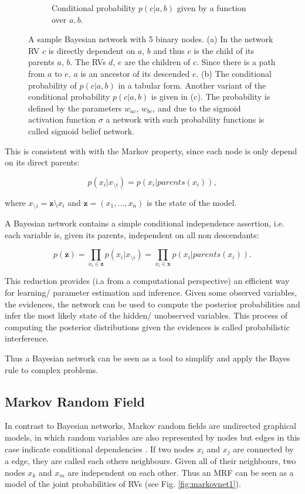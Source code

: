 \begin{figure}[h]
\begin{subfigure}[t]{.33\textwidth}
  		\caption{Conditional probability $p(c |a , b)$ given by a function over $a,b$.}
  		\label{fig:bayesnet}
	\end{subfigure}
	\caption{A sample Bayesian network with 5 binary nodes. (a) In the network RV $c$ is directly dependent on $a$, $b$ and thus $c$ is the child of its parents $a$, $b$. The RVs $d$, $e$ are the children of $c$. Since there is a path from $a$ to $e$, $a$ is an ancestor of its descended $e$. (b) The conditional probability of $p(c |a , b)$ in a tabular form. Another variant of the conditional probability $p(c |a , b)$ is given in (c). The probability is defined by the parameters $w_{ac}$, $w_{bc}$, and due to the sigmoid activation function $\sigma$ a network with such probability functions is called sigmoid belief network.}
	\label{fig:test}
\end{figure}

This is consistent with with the Markov property, since each node is only depend on its direct parents:

\[
p(x_i | x_{\setminus i}) = p(x_i | parents(x_i) ),
\]

where $x_{\setminus i} = \textbf{z} \setminus x_i$ and $\textbf{z} = (x_1, ... , x_n)$ is the state of the model.


A Bayesian network contains a simple conditional independence assertion, i.e. each variable is, given its parents, independent on all non descendants:

\[
p(\textbf{z}) = \prod_{x_i \in \textbf{z}} p(x_i | x_{\setminus i}) = \prod_{x_i \in \textbf{x}} p(x_i | parents(x_i) ) .
\]

This reduction provides (i.a from a computational perspective) an efficient way for learning/ parameter estimation and inference.
Given some observed variables, the evidences, the network can be used to compute the posterior probabilities and infer the most likely state of the hidden/ unobserved variables.
This process of computing the posterior distributions given the evidences is called probabilistic interference.

Thus a Bayesian network can be seen as a tool to simplify and apply the Bayes rule to complex problems.   

\subsection{Markov Random Field} \label{c:markovnet}

In contrast to Bayesian networks, Markov random fields are undirected graphical models, in which random variables are also represented by nodes but edges in this case indicate conditional dependencies \cite{Goodfellow-et-al-2016-Book}\cite{murphy2012machine}.
If two nodes $x_i$ and $x_j$ are connected by a edge, they are called each others neighbours.
Given all of their neighbours, two nodes $x_k$ and $x_m$ are independent on each other.
Thus an MRF can be seen as a model of the joint probabilities of RVs (see Fig. \ref{fig:markovnet1}).

